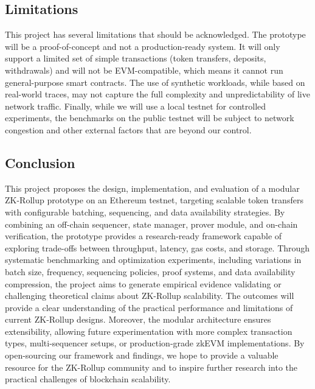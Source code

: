 \subsection{Limitations}
\vspace{12pt}
This project has several limitations that should be acknowledged. The prototype will be a proof-of-concept and not a production-ready system. It will only support a limited set of simple transactions (token transfers, deposits, withdrawals) and will not be EVM-compatible, which means it cannot run general-purpose smart contracts. The use of synthetic workloads, while based on real-world traces, may not capture the full complexity and unpredictability of live network traffic. Finally, while we will use a local testnet for controlled experiments, the benchmarks on the public testnet will be subject to network congestion and other external factors that are beyond our control.
\vspace{12pt}

\subsection{Conclusion}
\vspace{12pt}
This project proposes the design, implementation, and evaluation of a modular ZK-Rollup prototype on an Ethereum testnet, targeting scalable token transfers with configurable batching, sequencing, and data availability strategies. By combining an off-chain sequencer, state manager, prover module, and on-chain verification, the prototype provides a research-ready framework capable of exploring trade-offs between throughput, latency, gas costs, and storage. Through systematic benchmarking and optimization experiments, including variations in batch size, frequency, sequencing policies, proof systems, and data availability compression, the project aims to generate empirical evidence validating or challenging theoretical claims about ZK-Rollup scalability. The outcomes will provide a clear understanding of the practical performance and limitations of current ZK-Rollup designs. Moreover, the modular architecture ensures extensibility, allowing future experimentation with more complex transaction types, multi-sequencer setups, or production-grade zkEVM implementations. By open-sourcing our framework and findings, we hope to provide a valuable resource for the ZK-Rollup community and to inspire further research into the practical challenges of blockchain scalability.
\vspace{12pt}